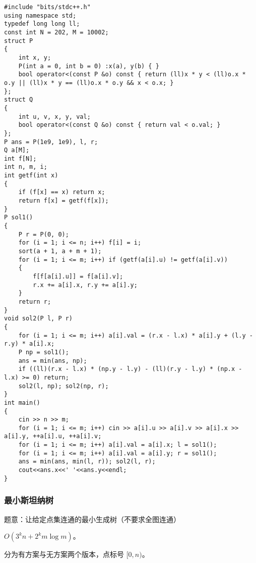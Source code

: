 \documentclass[12pt]{ctexart}
\begin{document}
\begin{lstlisting}
#include "bits/stdc++.h"
using namespace std;
typedef long long ll;
const int N = 202, M = 10002;
struct P
{
	int x, y;
	P(int a = 0, int b = 0) :x(a), y(b) { }
	bool operator<(const P &o) const { return (ll)x * y < (ll)o.x * o.y || (ll)x * y == (ll)o.x * o.y && x < o.x; }
};
struct Q
{
	int u, v, x, y, val;
	bool operator<(const Q &o) const { return val < o.val; }
};
P ans = P(1e9, 1e9), l, r;
Q a[M];
int f[N];
int n, m, i;
int getf(int x)
{
	if (f[x] == x) return x;
	return f[x] = getf(f[x]);
}
P sol1()
{
	P r = P(0, 0);
	for (i = 1; i <= n; i++) f[i] = i;
	sort(a + 1, a + m + 1);
	for (i = 1; i <= m; i++) if (getf(a[i].u) != getf(a[i].v))
	{
		f[f[a[i].u]] = f[a[i].v];
		r.x += a[i].x, r.y += a[i].y;
	}
	return r;
}
void sol2(P l, P r)
{
	for (i = 1; i <= m; i++) a[i].val = (r.x - l.x) * a[i].y + (l.y - r.y) * a[i].x;
	P np = sol1();
	ans = min(ans, np);
	if ((ll)(r.x - l.x) * (np.y - l.y) - (ll)(r.y - l.y) * (np.x - l.x) >= 0) return;
	sol2(l, np); sol2(np, r);
}
int main()
{
	cin >> n >> m;
	for (i = 1; i <= m; i++) cin >> a[i].u >> a[i].v >> a[i].x >> a[i].y, ++a[i].u, ++a[i].v;
	for (i = 1; i <= m; i++) a[i].val = a[i].x; l = sol1();
	for (i = 1; i <= m; i++) a[i].val = a[i].y; r = sol1();
	ans = min(ans, min(l, r)); sol2(l, r);
	cout<<ans.x<<' '<<ans.y<<endl;
}
\end{lstlisting}

\subsubsection{最小斯坦纳树}

题意：让给定点集连通的最小生成树（不要求全图连通）

$O(3^kn+2^km\log m)$。

分为有方案与无方案两个版本，点标号 $[0,n)$。
\end{document}

